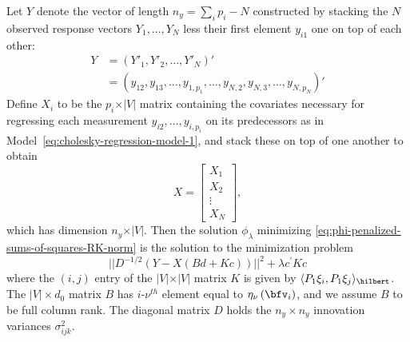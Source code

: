 Let $Y$ denote the vector of length $n_y= \sum_{i} p_i - N$  constructed by stacking the $N$ observed response vectors $Y_1,\dots, Y_N$ less their first element $y_{i1}$ one on top of each other:
\begin{align*}
Y &= \left( Y'_1, Y'_2, \dots, Y'_{N} \right)'\\
 &= \left( y_{12}, y_{13},\dots, y_{1,p_1}, \dots, y_{N,2}, y_{N,3},\dots, y_{N,p_N} \right)'
\end{align*}
\noindent
Define $X_i$ to be the $p_i \times \vert V \vert$ matrix containing the covariates necessary for regressing each measurement $y_{i2}, \dots, y_{i,p_i}$ on its predecessors as in Model~\ref{eq:cholesky-regression-model-1}, and stack these on top of one another to obtain
\begin{equation} \label{eq:ar-design-matrix-1}
X = \begin{bmatrix}
X_1 \\
X_2\\
\vdots \\
X_N
\end{bmatrix},
\end{equation}
\noindent
which has dimension $n_y \times \vert V \vert$. Then the solution $\phi_\lambda$ minimizing \ref{eq:phi-penalized-sums-of-squares-RK-norm}  is the solution to the minimization problem
\begin{equation} \label{eq:penalized-likelihood-vectorized}
\vert \vert D^{-1/2}\left( Y - X \left( Bd + Kc \right) \right) \vert \vert^2  + \lambda c^\prime K c 
\end{equation}
\noindent
where the $\left(i,j\right)$ entry of the $\vert V \vert \times \vert V \vert$ matrix $K$ is given by $\langle P_1 \xi_i,  P_1 \xi_j \rangle_\hilbert$. The $\vert V \vert \times d_0$ matrix $B$ has $i$-$\nu^{th}$ element equal to $\eta_\nu\left(\bfv_i\right)$, and we assume $B$ to be full column rank.  The diagonal matrix $D$ holds the $n_y \times n_y$  innovation variances $\sigma^2_{ijk}$. 

\bigskip

